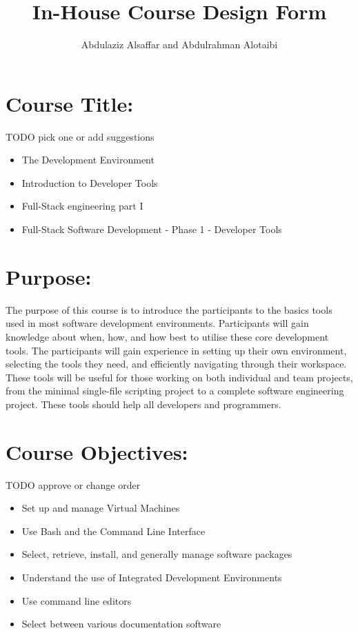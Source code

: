 \documentclass[a4paper,11pt]{article}
\author{Abdulaziz Alsa{f}far and Abdulrahman Alotaibi}
\title{In-House Course Design Form}
\begin{document}
\maketitle
\pagestyle{plain}
\setcounter{page}{1}

\section{Course Title:}
TODO pick one or add suggestions
\begin{itemize}
    \item The Development Environment
    \item Introduction to Developer Tools
    \item Full-Stack engineering part I
    \item Full-Stack Software Development - Phase 1 - Developer Tools
\end{itemize}

\section{Purpose:}
The purpose of this course is to introduce the participants to the basics tools used in most software development environments.
Participants will gain knowledge about when, how, and how best to utilise these core development tools. 
The participants will gain experience in setting up their own environment, selecting the tools they need, and e{f}ficiently navigating through their workspace. These tools will be useful for those working on both individual and team projects, from the minimal single-{f}ile scripting project to a complete software engineering project. These tools should help all developers and programmers.

\section{Course Objectives:}
TODO approve or change order
\begin{itemize}
	\item Set up and manage Virtual Machines
	\item Use Bash and the Command Line Interface
	\item Select, retrieve, install, and generally manage software packages
	\item Understand the use of Integrated Development Environments
	\item Use command line editors
	\item Select between various documentation software
\end{itemize}
\end{document}
